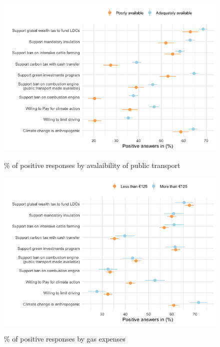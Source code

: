 \begin{framefont}{\small}
\begin{frame}{}%
\begin{figure}[h!]
\caption{\% of positive responses by avalaibility of public transport}
\includegraphics[width=.7\paperwidth]{../figures/FR/positive_all_by_availability_transport_FR.png} \\
\end{figure}
\end{frame}

\begin{frame}{}%
\begin{figure}[h!]
\caption{\% of positive responses by gas expenses}
\includegraphics[width=.7\paperwidth]{../figures/FR/positive_all_by_gas_expenses_FR.png} \\
\end{figure}
\end{frame}


\end{framefont}
